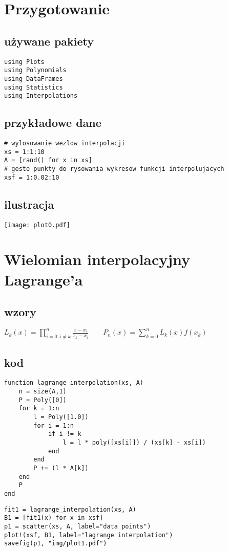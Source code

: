 





\section{\bf Przygotowanie}

\subsection{\bf używane pakiety}
\begin{lstlisting}
using Plots
using Polynomials
using DataFrames
using Statistics
using Interpolations
\end{lstlisting}

\subsection{\bf przykładowe dane}
\begin{lstlisting}
# wylosowanie wezlow interpolacji
xs = 1:1:10
A = [rand() for x in xs]
# geste punkty do rysowania wykresow funkcji interpolujacych
xsf = 1:0.02:10
\end{lstlisting}

\subsection{\bf ilustracja}
\begin{center}
    \texttt{[image: plot0.pdf]}
    \label{fig:0}
\end{center}
\clearpage
\section{\bf Wielomian interpolacyjny Lagrange’a}

\subsection{\bf wzory}
$L_k(x) = \displaystyle \prod_{i=0, i \neq k}^{n} \frac{x-x_i}{x_k-x_i}
\qquad P_n(x) = \displaystyle \sum_{k=0}^{n} L_k(x)f(x_k)$

\subsection{\bf kod}
\begin{lstlisting}
function lagrange_interpolation(xs, A)   
    n = size(A,1)
    P = Poly([0])
    for k = 1:n
        l = Poly([1.0])
        for i = 1:n
            if i != k
                l = l * poly([xs[i]]) / (xs[k] - xs[i])
            end
        end            
        P += (l * A[k])
    end
    P
end
\end{lstlisting}
\begin{lstlisting}
fit1 = lagrange_interpolation(xs, A)
B1 = [fit1(x) for x in xsf]
p1 = scatter(xs, A, label="data points")
plot!(xsf, B1, label="lagrange interpolation")
savefig(p1, "img/plot1.pdf")
\end{lstlisting}

